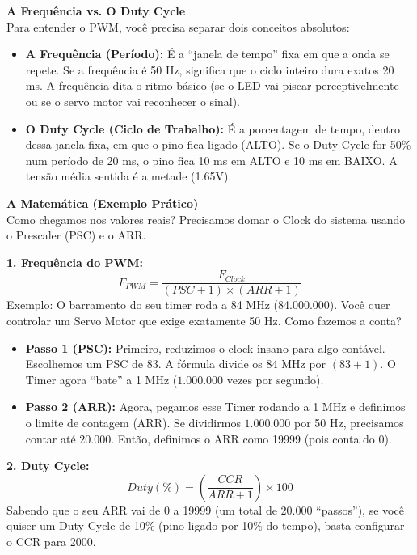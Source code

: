 \documentclass[12pt,a4paper]{article}
\begin{document}
\vspace{0.3cm}
\noindent\textbf{A Frequência vs. O Duty Cycle}\\
Para entender o PWM, você precisa separar dois conceitos absolutos:
\begin{itemize}
    \item \textbf{A Frequência (Período):} É a ``janela de tempo'' fixa em que a onda se repete. Se a frequência é 50 Hz, significa que o ciclo inteiro dura exatos 20 ms. A frequência dita o ritmo básico (se o LED vai piscar perceptivelmente ou se o servo motor vai reconhecer o sinal).
    \item \textbf{O Duty Cycle (Ciclo de Trabalho):} É a porcentagem de tempo, dentro dessa janela fixa, em que o pino fica ligado (ALTO). Se o Duty Cycle for 50\% num período de 20 ms, o pino fica 10 ms em ALTO e 10 ms em BAIXO. A tensão média sentida é a metade (1.65V).
\end{itemize}

\vspace{0.3cm}
\noindent\textbf{A Matemática (Exemplo Prático)}\\
Como chegamos nos valores reais? Precisamos domar o Clock do sistema usando o Prescaler (PSC) e o ARR.

\textbf{1. Frequência do PWM:}
\[ F_{PWM} = \frac{F_{Clock}}{(PSC + 1) \times (ARR + 1)} \]
Exemplo: O barramento do seu timer roda a 84 MHz (84.000.000). Você quer controlar um Servo Motor que exige exatamente 50 Hz. Como fazemos a conta?
\begin{itemize}
    \item \textbf{Passo 1 (PSC):} Primeiro, reduzimos o clock insano para algo contável. Escolhemos um PSC de 83. A fórmula divide os 84 MHz por $(83 + 1)$. O Timer agora ``bate'' a 1 MHz ($1.000.000$ vezes por segundo).
    \item \textbf{Passo 2 (ARR):} Agora, pegamos esse Timer rodando a 1 MHz e definimos o limite de contagem (ARR). Se dividirmos $1.000.000$ por 50 Hz, precisamos contar até $20.000$. Então, definimos o ARR como 19999 (pois conta do 0).
\end{itemize}

\textbf{2. Duty Cycle:}
\[ Duty(\%) = \left( \frac{CCR}{ARR + 1} \right) \times 100 \]
Sabendo que o seu ARR vai de 0 a 19999 (um total de 20.000 ``passos''), se você quiser um Duty Cycle de 10\% (pino ligado por 10\% do tempo), basta configurar o CCR para 2000.

\vspace{0.3cm}
\end{document}
